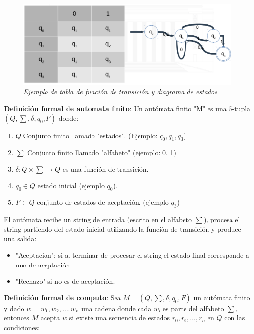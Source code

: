 \documentclass{article}
\begin{document}
\begin{figure}[h!]
    \begin{center} 
    \includegraphics[width=\linewidth]{imagenes/ejemplo-maquina-estado.png}
    \caption{\small \sl Ejemplo de tabla de función de transición y diagrama de estados} 
    \end{center}
\end{figure}
\textbf{Definición formal de automata finito}: Un autómata finito "M" es una 5-tupla \(\textstyle (Q,  \sum, \delta , q_0, F)\) donde:
\begin{enumerate}
    \item \(Q\) Conjunto finito llamado "estados". (Ejemplo: \(q_0,q_1,q_3\))
    \item \(\textstyle \sum\) Conjunto finito llamado "alfabeto" (ejemplo: 0, 1)
    \item \(\delta: Q \times \textstyle \sum \rightarrow Q\) es una función de transición.
    \item \(q_0 \in Q\) estado inicial (ejemplo \(q_0\)).
    \item \(F \subset Q\) conjunto de estados de aceptación. (ejemplo \(q_3\))
\end{enumerate}

El autómata recibe un string de entrada (escrito en el alfabeto \(\textstyle \sum\)), procesa el string
partiendo del estado inicial utilizando la función de transición y produce una salida:
\begin{itemize}
    \item "Aceptación": si al terminar de procesar el string el estado final corresponde a uno de aceptación.
    \item "Rechazo" si no es de aceptación.
\end{itemize}


\textbf{Definición formal de computo}: Sea \(M=\textstyle (Q,  \sum, \delta , q_0, F)\) un autómata finito y 
dado \(w=w_1, w_2, \dots, w_n\) una cadena donde cada \(w_i\) es parte del alfabeto \(\textstyle \sum\), 
entonces \(M\) acepta \(w\) si existe una secuencia de estados \(r_0,r_0,\dots,r_n\) en \(Q\) con las condiciones:
\end{document}
